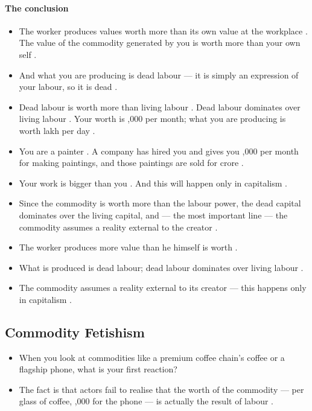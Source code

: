 \paragraph{The conclusion}
\begin{itemize}
    \item The worker produces values worth more than its own value at the workplace . The value of the commodity generated by you is worth more than your own self .
    \item And what you are producing is dead labour --- it is simply an expression of your labour, so it is dead .
    \item Dead labour is worth more than living labour . Dead labour dominates over living labour . Your worth is ,000 per month; what you are producing is worth  lakh per day .
\end{itemize}

\begin{ExampleBox}
\begin{itemize}
    \item You are a painter . A company has hired you and gives you ,000 per month for making paintings, and those paintings are sold for  crore .
    \item Your work is bigger than you . And this will happen only in capitalism .
\end{itemize}
\end{ExampleBox}

\begin{itemize}
    \item Since the commodity is worth more than the labour power, the dead capital dominates over the living capital, and --- the most important line --- the commodity assumes a reality external to the creator .
\end{itemize}

\begin{QuickRevision}
\begin{itemize}
    \item The worker produces more value than he himself is worth .
    \item What is produced is dead labour; dead labour dominates over living labour .
    \item The commodity assumes a reality external to its creator --- this happens only in capitalism .
\end{itemize}
\end{QuickRevision}

\subsection{Commodity Fetishism}
\begin{itemize}
    \item When you look at commodities like a premium coffee chain's coffee or a flagship phone, what is your first reaction? 
    \item The fact is that actors fail to realise that the worth of the commodity ---  per glass of coffee, ,000 for the phone --- is actually the result of labour .
\end{itemize}

